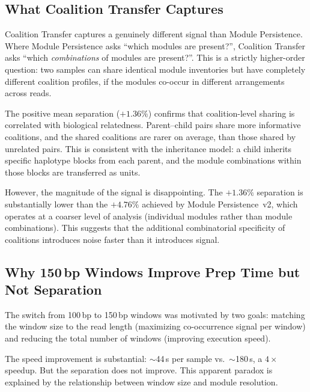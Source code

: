 \documentclass{../yalumba}
\begin{document}
\subsection{What Coalition Transfer Captures}
\label{sec:discussion-captures}

Coalition Transfer captures a genuinely different signal than Module
Persistence.  Where Module Persistence asks ``which modules are present?'',
Coalition Transfer asks ``which \emph{combinations} of modules are present?''.
This is a strictly higher-order question: two samples can share identical
module inventories but have completely different coalition profiles, if the
modules co-occur in different arrangements across reads.

The positive mean separation ($+1.36\%$) confirms that coalition-level
sharing is correlated with biological relatedness.  Parent--child pairs share
more informative coalitions, and the shared coalitions are rarer on average,
than those shared by unrelated pairs.  This is consistent with the inheritance
model: a child inherits specific haplotype blocks from each parent, and the
module combinations within those blocks are transferred as units.

However, the magnitude of the signal is disappointing.  The $+1.36\%$
separation is substantially lower than the $+4.76\%$ achieved by Module
Persistence~v2, which operates at a coarser level of analysis (individual
modules rather than module combinations).  This suggests that the additional
combinatorial specificity of coalitions introduces noise faster than it
introduces signal.

\subsection{Why 150\,bp Windows Improve Prep Time but Not Separation}
\label{sec:discussion-windows}

The switch from 100\,bp to 150\,bp windows was motivated by two goals:
matching the window size to the read length (maximizing co-occurrence
signal per window) and reducing the total number of windows (improving
execution speed).


The speed improvement is substantial: $\sim$44\,s per sample vs.\
$\sim$180\,s, a $4{\times}$ speedup.  But the separation does not improve.
This apparent paradox is explained by the relationship between window size
and module resolution.
\end{document}
